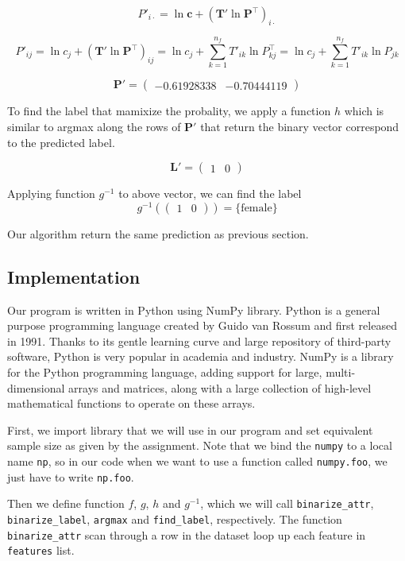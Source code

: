 \documentclass[a4paper]{article}
\newcommand{\matr}[1]{\mathbf{#1}}
\renewcommand{\vec}[1]{\mathbf{#1}}
\newcommand{\code}[1]{\texttt{#1}}
\begin{document}
			\[P'_{i \cdot} = \ln \vec{c} + (\matr{T'}\ln\matr{P}^\top)_{i \cdot}\]

			\[
				P'_{ij} = \ln c_j + (\matr{T'}\ln\matr{P}^\top)_{ij}
				        = \ln c_j + \sum_{k=1}^{n_f} T'_{ik}\ln P_{kj}^\top
								= \ln c_j + \sum_{k=1}^{n_f} T'_{ik}\ln P_{jk}
			\]

			\[\matr{P'} = \begin{pmatrix}-0.61928338 & -0.70444119 \end{pmatrix}\]

			To find the label that mamixize the probality, we apply a function $h$
			which is similar to argmax
			along the rows of $\matr{P'}$ that return the binary vector correspond to
			the predicted label.

			\[\matr{L'} = \begin{pmatrix}1 & 0\end{pmatrix}\]

			Applying function $g^{-1}$ to above vector, we can find the label
			\[g^{-1}\left(\begin{pmatrix}1 & 0\end{pmatrix}\right)=\{\text{female}\}\]
		
			Our algorithm return the same prediction as previous section.

	\subsection{Implementation}

		Our program is written in Python using NumPy library. Python is a general purpose programming language created by Guido van Rossum
		and first released in 1991. Thanks to its gentle learning curve and large
		repository of third-party software, Python is very popular in academia and
		industry. NumPy is a library for the Python programming language, adding
		support for large, multi-dimensional arrays and matrices, along with a large
		collection of high-level mathematical functions to operate on these arrays.

		First, we import library that we will use in our program and set equivalent sample size
		as given by the assignment. Note that we bind the \code{numpy} to a local
		name \code{np}, so in our code when we want to use a function called
		\code{numpy.foo}, we just have to write \code{np.foo}.

			

		Then we define function $f$, $g$, $h$ and $g^{-1}$, which
		we will call \code{binarize\_attr}, \code{binarize\_label},
		\code{argmax} and \code{find\_label}, respectively. The function
		\code{binarize\_attr} scan through a row in the dataset loop up each feature
		in \code{features} list. 
\end{document}
